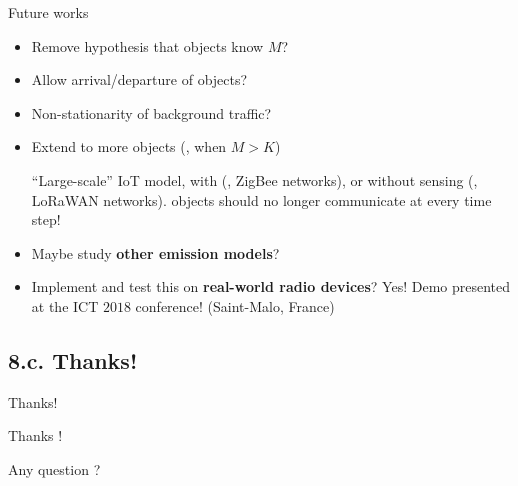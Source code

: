 \documentclass[12pt,english,ignorenonframetext,]{beamer}
\newcommand{\Fontify}{}
\providecommand{\tightlist}{%
  \setlength{\itemsep}{0pt}\setlength{\parskip}{0pt}}
\begin{document}
\begin{frame}{Future works}

\begin{itemize}\tightlist
\item
  Remove hypothesis that objects know \(M\)?
\item
  Allow arrival/departure of objects?
\item
  Non-stationarity of background traffic?

\vspace*{15pt}
\pause

\item Extend to more objects (\ie, when \(M > K\))

``Large-scale'' IoT model,
with (\eg, ZigBee networks),
or without sensing (\eg, LoRaWAN networks).
\hook objects should no longer communicate at every time step!

\vspace*{15pt}
\pause

\item
  Maybe study \textbf{other emission models}?
\item
  Implement and test this on \textbf{real-world radio devices}?
  \hook Yes! Demo presented at the ICT \(2018\) conference! (Saint-Malo, France)

\end{itemize}

\end{frame}


\subsection{\hfill{}8.c. Thanks!\hfill{}}

\begin{frame}{Thanks!}

\begin{center}\begin{Huge}
  {\Fontify Thanks !}
  \Smiley[0.9]
\end{Huge}\end{center}

\vspace*{20pt}

\begin{center}\begin{Huge}
  {\Fontify Any question ?}
\end{Huge}\end{center}

\end{frame}
\end{document}
